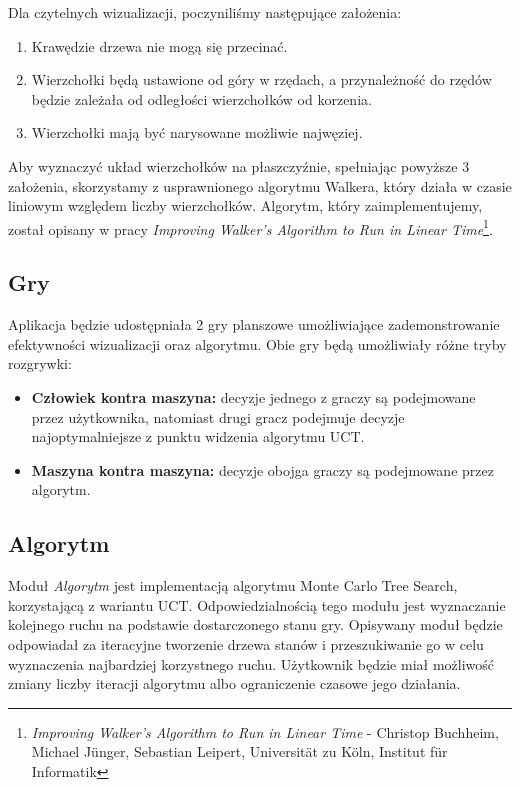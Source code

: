 \documentclass{article}
\newcommand{\modulename}[1]{\textit{#1}}
\begin{document}
	\noindent Dla czytelnych wizualizacji, poczyniliśmy następujące założenia: \\
	
	\begin{enumerate}
		\item Krawędzie drzewa nie mogą się przecinać.
		\item Wierzchołki będą ustawione od góry w rzędach, a przynależność do
		rzędów będzie zależała od odległości wierzchołków od korzenia.
		\item Wierzchołki mają być narysowane możliwie najwęziej.  \\
	\end{enumerate}

	\noindent Aby wyznaczyć układ wierzchołków na płaszczyźnie, spełniając powyższe 3 założenia, skorzystamy z usprawnionego algorytmu Walkera, który działa w czasie liniowym względem liczby wierzchołków. Algorytm, który zaimplementujemy, został opisany w pracy \textit{Improving Walker's Algorithm to Run in Linear Time}\footnote{\modulename{Improving Walker's Algorithm to Run in Linear Time} - Christop Buchheim, Michael Jünger, Sebastian Leipert, Universität zu Köln, Institut für Informatik}.
	
	\subsection{Gry}
	Aplikacja będzie udostępniała 2 gry planszowe umożliwiające zademonstrowanie efektywności wizualizacji oraz algorytmu. Obie gry będą umożliwiały różne tryby rozgrywki: \\
	
	\begin{itemize}
		\item \textbf{Człowiek kontra maszyna:} decyzje jednego z graczy są podejmowane przez użytkownika, natomiast drugi gracz podejmuje decyzje najoptymalniejsze z punktu widzenia algorytmu UCT.
		\item \textbf{Maszyna kontra maszyna:} decyzje obojga graczy są podejmowane przez algorytm. 
	\end{itemize}
	
	
	\subsection{Algorytm}
	Moduł \modulename{Algorytm} jest implementacją algorytmu Monte Carlo Tree Search, korzystającą z wariantu UCT. Odpowiedzialnością tego modułu jest wyznaczanie kolejnego ruchu na podstawie dostarczonego stanu gry. Opisywany moduł będzie odpowiadał za iteracyjne tworzenie drzewa stanów i przeszukiwanie go w celu wyznaczenia najbardziej korzystnego ruchu. Użytkownik będzie miał możliwość zmiany liczby iteracji algorytmu albo ograniczenie czasowe jego działania. \\
	
\end{document}
